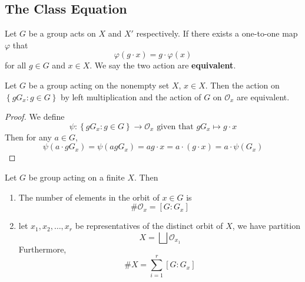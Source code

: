 \subsection{The Class Equation} %
\begin{definition}
    Let $G$ be a group acts on $X$ and $X'$ respectively. If there exists a one-to-one map $\varphi$ that
    \[
        \varphi (g\cdot x)
        =
        g\cdot \varphi(x)
    \]
    for all $g\in G$ and $x\in X$. We say the two action are \textbf{equivalent}.
\end{definition}
\begin{theorem}
    Let $G$ be a group acting on the nonempty set $X$, $x\in X$. Then the action on $\left\{gG_x:g\in G\right\}$ by left multiplication and the action of $G$ on $\mathcal{O}_x$ are equivalent.
    \begin{proof}
        We define
        \begin{equation*}
            \psi:
            \left\{gG_x:g\in G\right\}\longrightarrow \mathcal{O}_x \text{  given that  } gG_x \mapsto g \cdot x
        \end{equation*}
        Then for any $a\in G$,
        \begin{equation*}
            \psi\left(a\cdot gG_x\right)
            =
            \psi\left(agG_x\right)
            =
            ag\cdot x
            =
            a\cdot \left(g\cdot x\right)
            =
            a\cdot \psi\left(G_x\right)
        \end{equation*}
    \end{proof}
\end{theorem}

\begin{corollary}
    \label{cor: The class equation}
    Let $G$ be group acting on a finite $X$. Then
    \begin{enumerate}
        \item
              The number of elements in the orbit of $x\in G$ is
              \begin{equation*}
                  \#\mathcal{O}_x
                  =
                  \left[G:G_x\right]
              \end{equation*}

        \item
              let $x_1, x_2, \ldots, x_r$ be representatives of the distinct orbit of $X$, we have partition
              \begin{equation*}
                  X
                  =
                  \bigsqcup \mathcal{O}_{x_1}
              \end{equation*}
              Furthermore,
              \begin{equation*}
                  \# X
                  =
                  \sum_{i=1}^r [G:G_x]
              \end{equation*}
    \end{enumerate}
\end{corollary}


